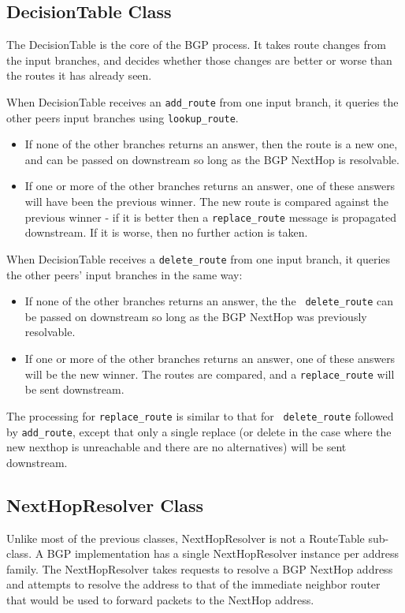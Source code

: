 \documentclass[11pt]{article}
\begin{document}
\subsection{DecisionTable Class}

The DecisionTable is the core of the BGP process.  It takes route
changes from the input branches, and decides whether those changes are
better or worse than the routes it has already seen.

When DecisionTable receives an {\tt add\_route} from one input branch,
it queries the other peers input branches using {\tt lookup\_route}.
\begin{itemize}
\item If none of the other branches returns an answer, then the route is a
new one, and can be passed on downstream so long as the BGP NextHop is
resolvable.  
\item If one or more of the other branches returns an
answer, one of these answers will have been the previous winner.  The
new route is compared against the previous winner - if it is better
then a {\tt replace\_route} message is propagated downstream.  If it
is worse, then no further action is taken.
\end{itemize}

When DecisionTable receives a {\tt delete\_route} from one input
branch, it queries the other peers' input branches in the same way:
\begin{itemize}
\item If none of the other branches returns an answer, the the {\tt
delete\_route} can be passed on downstream so long as the BGP NextHop
was previously resolvable.
\item If one or more of the other branches returns an
answer, one of these answers will be the new winner.  The routes are
compared, and a {\tt replace\_route} will be sent downstream.
\end{itemize}

The processing for {\tt replace\_route} is similar to that for {\tt
delete\_route} followed by {\tt add\_route}, except that only a single
replace (or delete in the case where the new nexthop is unreachable
and there are no alternatives) will be sent downstream.

\subsection{NextHopResolver Class}

Unlike most of the previous classes, NextHopResolver is not a
RouteTable sub-class.  A BGP implementation has a single NextHopResolver
instance per address family.  The NextHopResolver takes requests to
resolve a BGP NextHop address and attempts to resolve the address to
that of the immediate neighbor router that would be used to forward
packets to the NextHop address.
\end{document}
